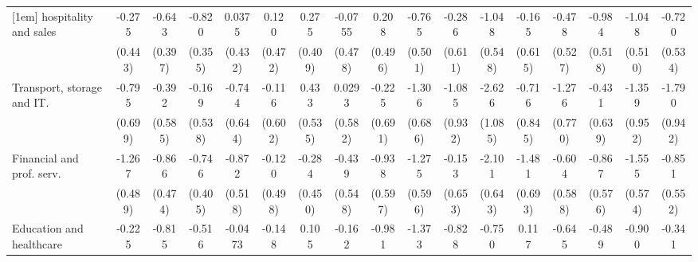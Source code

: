 {\begin{tabular}{l*{16}{c}}
[1em]
hospitality and sales&      -0.275         &      -0.643         &      -0.820\sym{*}  &      0.0375         &       0.120         &       0.275         &     -0.0755         &       0.208         &      -0.765         &      -0.286         &      -1.048         &      -0.165         &      -0.478         &      -0.984         &      -1.048\sym{*}  &      -0.720         \\
                    &     (0.443)         &     (0.397)         &     (0.355)         &     (0.432)         &     (0.472)         &     (0.409)         &     (0.478)         &     (0.496)         &     (0.501)         &     (0.611)         &     (0.548)         &     (0.615)         &     (0.527)         &     (0.518)         &     (0.510)         &     (0.534)         \\
[1em]
Transport, storage and IT.&      -0.795         &      -0.392         &      -0.169         &      -0.744         &      -0.116         &       0.433         &      0.0293         &      -0.225         &      -1.306         &      -1.085         &      -2.626\sym{*}  &      -0.716         &      -1.276         &      -0.431         &      -1.359         &      -1.790         \\
                    &     (0.699)         &     (0.585)         &     (0.538)         &     (0.644)         &     (0.602)         &     (0.535)         &     (0.582)         &     (0.691)         &     (0.686)         &     (0.932)         &     (1.085)         &     (0.845)         &     (0.770)         &     (0.639)         &     (0.952)         &     (0.942)         \\
[1em]
Financial and prof. serv.&      -1.267\sym{**} &      -0.866         &      -0.746         &      -0.872         &      -0.120         &      -0.284         &      -0.439         &      -0.938         &      -1.275\sym{*}  &      -0.153         &      -2.101\sym{**} &      -1.481\sym{*}  &      -0.604         &      -0.867         &      -1.555\sym{**} &      -0.851         \\
                    &     (0.489)         &     (0.474)         &     (0.405)         &     (0.518)         &     (0.498)         &     (0.450)         &     (0.548)         &     (0.597)         &     (0.596)         &     (0.653)         &     (0.643)         &     (0.693)         &     (0.588)         &     (0.576)         &     (0.574)         &     (0.552)         \\
[1em]
Education and healthcare&      -0.225         &      -0.815         &      -0.516         &     -0.0473         &      -0.148         &       0.105         &      -0.162         &      -0.981         &      -1.373\sym{**} &      -0.828         &      -0.750         &       0.117         &      -0.645         &      -0.489         &      -0.900         &      -0.341         \\

\end{tabular}}
